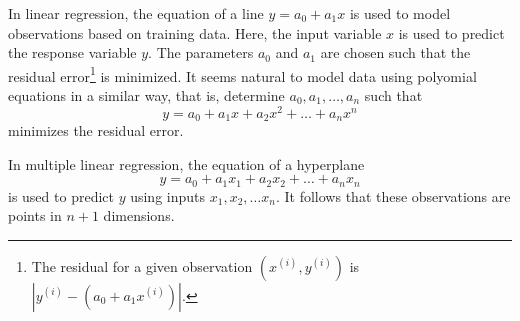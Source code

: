 In linear regression, the equation of a line \(y = a_0 + a_1 x\) is used to model observations based on training data.
Here, the input variable \(x\) is used to predict the response variable \(y\).
The parameters \(a_0\) and \(a_1\) are chosen such that the residual error\footnote{The residual for a given observation \(\left(x^{(i)},y^{(i)}\right)\) is \(\left|y^{(i)} - \left(a_0 + a_1 x^{(i)}\right)\right|\).} is minimized.
It seems natural to model data using polyomial equations in a similar way, that is, determine \(a_0, a_1, \dots, a_n\) such that
\begin{equation}
    \label{eqn:polynomial-regression}
    y = a_0 + a_1 x + a_2 x^2 + \dots + a_n x^n
\end{equation}
minimizes the residual error.

In multiple linear regression, the equation of a hyperplane
\begin{equation}
    \label{eqn:multiple-linear-regression}
    y = a_0 + a_1 x_1 + a_2 x_2 + \dots + a_n x_n
\end{equation}
is used to predict \(y\) using inputs \(x_1, x_2, \dots x_n\).
It follows that these observations are points in \(n + 1\) dimensions.